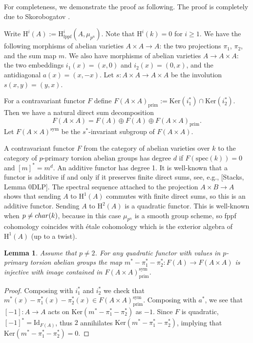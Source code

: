 \documentclass[a4paper,12pt,twoside]{report}
\newtheorem{lemma}[theorem]{Lemma}
\newcommand{\fppf}{\mathrm{fppf}}
\newcommand{\prim}{\mathrm{prim}}
\newcommand{\HH}{\mathrm{H}}
\newcommand{\sym}{\mathrm{sym}}
\newcommand{\spec}{\mathrm{spec}}
\newcommand{\Ker}{\mathrm{Ker}}
\begin{document}
For completeness, we demonstrate the proof as following. The proof is completely due to Skorobogatov \cite{Skor}. 

Write $\HH^i(A):=\HH^i_{\fppf}(A,\mu_{p^n})$. Note that $\HH^i(k)=0$ for $i\geqslant 1$.
We have the following morphisms of abelian varieties $A\times A\to A$: the two projections
$\pi_1$, $\pi_2$, and the sum map $m$.
We also have morphisms of abelian varieties $A\to A\times A$: the two embeddings
$i_1(x)=(x,0)$ and $i_2(x)=(0,x)$, and the antidiagonal $a(x)=(x,-x)$.
Let $s\colon A\times A\to A\times A$ be the involution $s(x,y)=(y,x)$.

For a contravariant functor $F$ define
$F(A\times A)_\prim:=\Ker(i_1^*)\cap\Ker(i_2^*)$.
Then we have a natural direct sum decomposition
$$F(A\times A)=F(A)\oplus F(A)\oplus F(A\times A)_\prim.$$
Let $F(A\times A)^\sym$ be the $s^*$-invariant subgroup of $F(A\times A)$.

A contravariant functor $F$ from the category of abelian varieties over $k$
to the category of $p$-primary torsion abelian groups has degree $d$
if $F(\spec(k))=0$ and $[m]^*=m^d$.
An additive functor has degree 1. It is well-known that a functor is additive if and only if
it preserves finite direct sums, see, e.g., [Stacks, Lemma 0DLP].
The spectral sequence attached to the projection $A\times B\to A$ shows that
sending $A$ to $\HH^1(A)$ commutes with finite direct sums, so this is an additive functor.
Sending $A$ to $\HH^2(A)$ is a quadratic functor. This is well-known when $p\neq{\rm char}(k)$,
because in this case $\mu_{p^n}$ is a smooth group scheme, so
fppf cohomology coincides with \'etale cohomology which is the exterior algebra of $\HH^1(A)$
(up to a twist). 

\begin{lemma} \label{2}   
Assume that $p\neq 2$. For any quadratic functor with values in $p$-primary torsion abelian
groups the map $m^*-\pi_1^*-\pi_2^*\colon F(A)\to F(A\times A)$
is injective with image contained in $F(A\times A)_\prim^\sym$.
\end{lemma}

\begin{proof}
Composing with $i_1^*$ and $i_2^*$ 
we check that $m^*(x)-\pi_1^*(x)-\pi_2^*(x)\in F(A\times A)^\sym_\prim$.
Composing with $a^*$, we see that $[-1]:A\to A$ acts on $\Ker(m^*-\pi_1^*-\pi_2^*)$ as
$-1$. Since $F$ is quadratic, $[-1]^*=\mathrm{Id}_{F(A)}$, thus $2$ annihilates 
$\Ker(m^*-\pi_1^*-\pi_2^*)$, implying that $\Ker(m^*-\pi_1^*-\pi_2^*)=0$. 
\end{proof}
\end{document}
